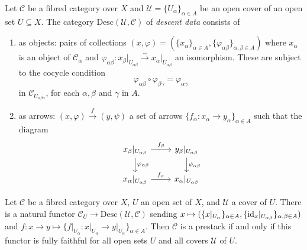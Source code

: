 \begin{definition}\label{def:descend-data}
	Let $\mathcal{C}$ be a fibred category over $X$ and $\mathscr{U} = \{U_{\alpha}\}_{\alpha\in A}$ be an open cover of an open set $U\subseteq X$. The category $\mathrm{Desc}(\mathscr{U}, \mathcal{C})$ of \emph{descent data} consists of
	\begin{enumerate}[label = (\roman*)]
		\item as objects: pairs of collections $(x,\varphi) = (\{x_{\alpha}\}_{\alpha\in A}, \{\varphi_{\alpha\beta}\}_{\alpha, \beta\in A})$ where $x_{\alpha}$ is an object of $\mathcal{C}_{\alpha}$ and $\varphi_{\alpha\beta}\colon x_{\beta}\lvert_{U_{\alpha\beta}} \xrightarrow{\sim} x_{\alpha}\lvert_{U_{\alpha\beta}}$ an isomorphism. These are subject to the cocycle condition
		\begin{equation}\label{eqn:cocycle-condition}
			\varphi_{\alpha\beta} \circ \varphi_{\beta\gamma} = \varphi_{\alpha\gamma}
		\end{equation}
		in $\mathcal{C}_{U_{\alpha\beta\gamma}}$, for each $\alpha, \beta$ and $\gamma$ in $A$.
		\item as arrows: $(x, \varphi) \xrightarrow{f} (y, \psi)$ a set of arrows $\{f_{\alpha}\colon x_{\alpha} \to y_{\alpha}\}_{\alpha\in A}$ such that the diagram
		\begin{equation}\label{eqn:compatibility-descent-data}
			\begin{tikzcd}
				x_{\beta}\lvert_{U_{\alpha\beta}} \ar[r, "f_{\beta}"] \ar[d, "\varphi_{\alpha \beta}"] & y_{\beta}\lvert_{U_{\alpha\beta}} \ar[d, "\psi_{\alpha \beta}"] \\
				x_{\alpha}\lvert_{U_{\alpha\beta}} \ar[r, "f_{\alpha}"] & x_{\alpha}\lvert_{U_{\alpha\beta}} 
			\end{tikzcd}
		\end{equation}
		
	\end{enumerate}
	
\end{definition}
\begin{remark}\label{rem:fibred-category-induces-descent}
	Let $\mathcal{C}$ be a fibred category over $X$, $U$ an open set of $X$, and $\mathscr{U}$ a cover of $U$. There is a natural functor $\mathcal{C}_{U} \to \mathrm{Desc}(\mathscr{U}, \mathcal{C})$ sending $x \mapsto (\{x\lvert_{U_{\alpha}}\}_{\alpha\in A}, \{\operatorname{id}_{x}\lvert_{U_{\alpha\beta}}\}_{\alpha,\beta\in A})$ and $f\colon x \to y \mapsto \{f\lvert_{U_{\alpha}}\colon x\lvert_{U_{\alpha}} \to y\lvert_{U_{\alpha}}\}_{\alpha\in A}$. Then $\mathcal{C}$ is a prestack if and only if this functor is fully faithful for all open sets $U$ and all covers $\mathscr{U}$ of $U$.
\end{remark}
